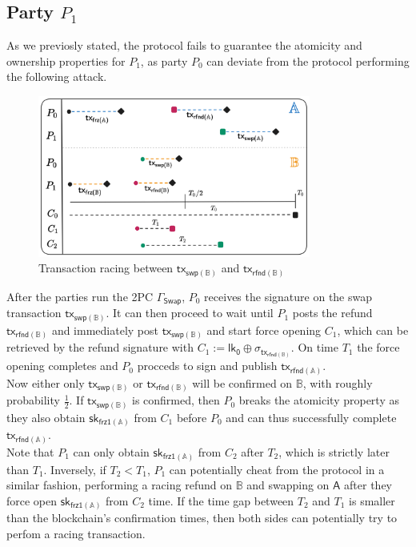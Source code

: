 \documentclass{article}      	%
\begin{document}
\subsection{Party $P_1$}
As we previosly stated, the protocol fails to guarantee the atomicity and ownership properties for $P_1$, as party $P_0$ can deviate from the protocol performing the following attack. \\
\begin{figure}[H]
    \centering
    \includegraphics[width=0.8\textwidth]{timeouts.png}
    \caption{Transaction racing between  $\mathsf{tx_{swp(\mathbb{B})}}$ and $\mathsf{tx_{rfnd(\mathbb{B})}}$}
\end{figure}
After the parties run the 2PC $\Gamma_{\mathsf{Swap}}$, $P_0$ receives the signature on the swap transaction $\mathsf{tx_{swp(\mathbb{B})}}$. It can then proceed to wait until $P_1$ posts the refund $\mathsf{tx_{rfnd(\mathbb{B})}}$ and immediately post $\mathsf{tx_{swp(\mathbb{B})}}$ and start force opening $C_1$, which can be retrieved by the refund signature with $C_1 := \mathsf{lk_0} \oplus \sigma_{\mathsf{tx_{rfnd(\mathbb{B})}}}$. On time $T_1$ the force opening completes and $P_0$ procceds to sign and publish $\mathsf{tx_{rfnd(\mathbb{A})}}$. \\
Now either only $\mathsf{tx_{swp(\mathbb{B})}}$ or  $\mathsf{tx_{rfnd(\mathbb{B})}}$ will be confirmed on $\mathbb{B}$, with roughly probability $\frac{1}{2}$. If $\mathsf{tx_{swp(\mathbb{B})}}$ is confirmed, then $P_0$ breaks the atomicity property as they also obtain $\mathsf{sk_{frz1(\mathbb{A})}}$ from $C_1$ before $P_0$ and can thus successfully complete $\mathsf{tx_{rfnd(\mathbb{A})}}$. \\
Note that $P_1$ can only obtain $\mathsf{sk_{frz1(\mathbb{A})}}$ from $C_2$ after $T_2$, which is strictly later than $T_1$. Inversely, if $T_2 < T_1$, $P_1$ can potentially cheat from the protocol in a similar fashion, performing a racing refund on $\mathbb{B}$ and swapping on $\mathsf{A}$ after they force open $\mathsf{sk_{frz1(\mathbb{A})}}$ from $C_2$ time. If the time gap between $T_2$ and $T_1$ is smaller than the blockchain's confirmation times, then both sides can potentially try to perfom a racing transaction.
\end{document}
